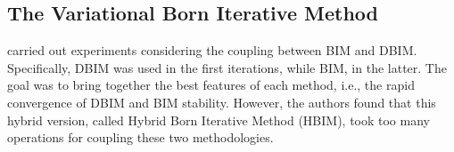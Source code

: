 		\subsection{The Variational Born Iterative Method}\label{chap:methods:deterministic:vbim}
			
			\cite{zaiping1998hybrid} carried out experiments considering the coupling between BIM and DBIM. Specifically, DBIM was used in the first iterations, while BIM, in the latter. The goal was to bring together the best features of each method, i.e., the rapid convergence of DBIM and BIM stability. However, the authors found that this hybrid version, called Hybrid Born Iterative Method (HBIM), took too many operations for coupling these two methodologies.
			
